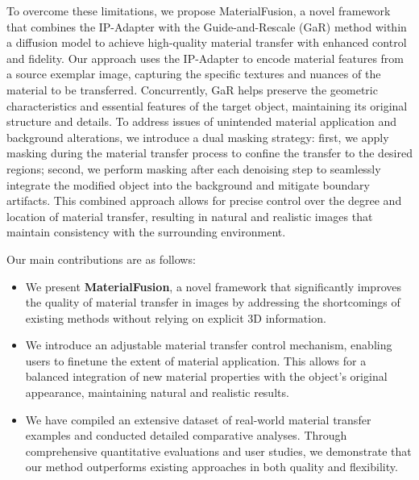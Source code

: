 To overcome these limitations, we propose MaterialFusion, a novel framework that combines the IP-Adapter with the Guide-and-Rescale (GaR) method within a diffusion model to achieve high-quality material transfer with enhanced control and fidelity. Our approach uses the IP-Adapter to encode material features from a source exemplar image, capturing the specific textures and nuances of the material to be transferred. Concurrently, GaR helps preserve the geometric characteristics and essential features of the target object, maintaining its original structure and details. To address issues of unintended material application and background alterations, we introduce a dual masking strategy: first, we apply masking during the material transfer process to confine the transfer to the desired regions; second, we perform masking after each denoising step to seamlessly integrate the modified object into the background and mitigate boundary artifacts. This combined approach allows for precise control over the degree and location of material transfer, resulting in natural and realistic images that maintain consistency with the surrounding environment.

\noindent Our main contributions are as follows:

\begin{itemize}
    \item We present \textbf{MaterialFusion}, a novel framework that significantly improves the quality of material transfer in images by addressing the shortcomings of existing methods without relying on explicit 3D information.
    
    \item We introduce an adjustable material transfer control mechanism, enabling users to finetune the extent of material application. This allows for a balanced integration of new material properties with the object's original appearance, maintaining natural and realistic results.
    
    \item We have compiled an extensive dataset of real-world material transfer examples and conducted detailed comparative analyses. Through comprehensive quantitative evaluations and user studies, we demonstrate that our method outperforms existing approaches in both quality and flexibility.
\end{itemize}
